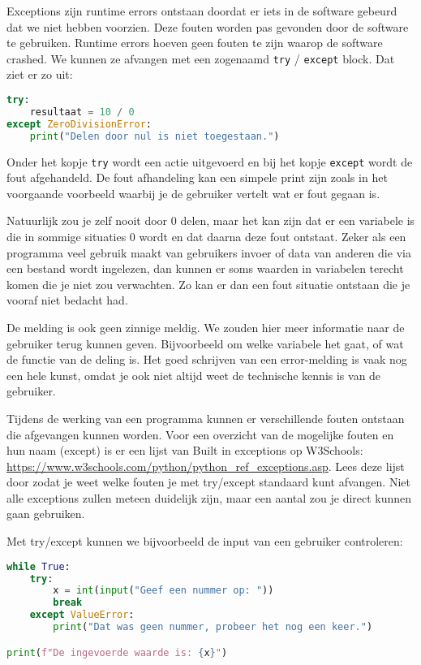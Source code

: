 Exceptions zijn runtime errors ontstaan doordat er iets in de software gebeurd dat we niet hebben voorzien. Deze fouten worden pas gevonden door de software te gebruiken. Runtime errors hoeven geen fouten te zijn waarop de software crashed. We kunnen ze afvangen met een zogenaamd \texttt{try} / \texttt{except} block. Dat ziet er zo uit:
\begin{lstlisting}[language=python]
try:
    resultaat = 10 / 0
except ZeroDivisionError:
    print("Delen door nul is niet toegestaan.")
\end{lstlisting}

Onder het kopje \texttt{try} wordt een actie uitgevoerd en bij het kopje \texttt{except} wordt de fout afgehandeld. De fout afhandeling kan een simpele print zijn zoals in het voorgaande voorbeeld waarbij je de gebruiker vertelt wat er fout gegaan is.

Natuurlijk zou je zelf nooit door 0 delen, maar het kan zijn dat er een variabele is die in sommige situaties 0 wordt en dat daarna deze fout ontstaat. Zeker als een programma veel gebruik maakt van gebruikers invoer of data van anderen die via een bestand wordt ingelezen, dan kunnen er soms waarden in variabelen terecht komen die je niet zou verwachten. Zo kan er dan een fout situatie ontstaan die je vooraf niet bedacht had.

De melding  is ook geen zinnige meldig. We zouden hier meer informatie naar de gebruiker terug kunnen geven. Bijvoorbeeld om welke variabele het gaat, of wat de functie van de deling is. Het goed schrijven van een error-melding is vaak nog een hele kunst, omdat je ook niet altijd weet de technische kennis is van de gebruiker.

Tijdens de werking van een programma kunnen er verschillende fouten ontstaan die afgevangen kunnen worden. Voor een overzicht van de mogelijke fouten en hun naam (except) is er een lijst van Built in exceptions op W3Schools: \url{https://www.w3schools.com/python/python_ref_exceptions.asp}. Lees deze lijst door zodat je weet welke fouten je met try/except standaard kunt afvangen. Niet alle exceptions zullen meteen duidelijk zijn, maar een aantal zou je direct kunnen gaan gebruiken.

Met try/except kunnen we bijvoorbeeld de input van een gebruiker controleren:
\begin{lstlisting}[language=python]
while True:
    try:
        x = int(input("Geef een nummer op: "))
        break
    except ValueError:
        print("Dat was geen nummer, probeer het nog een keer.")

print(f"De ingevoerde waarde is: {x}")
\end{lstlisting}

